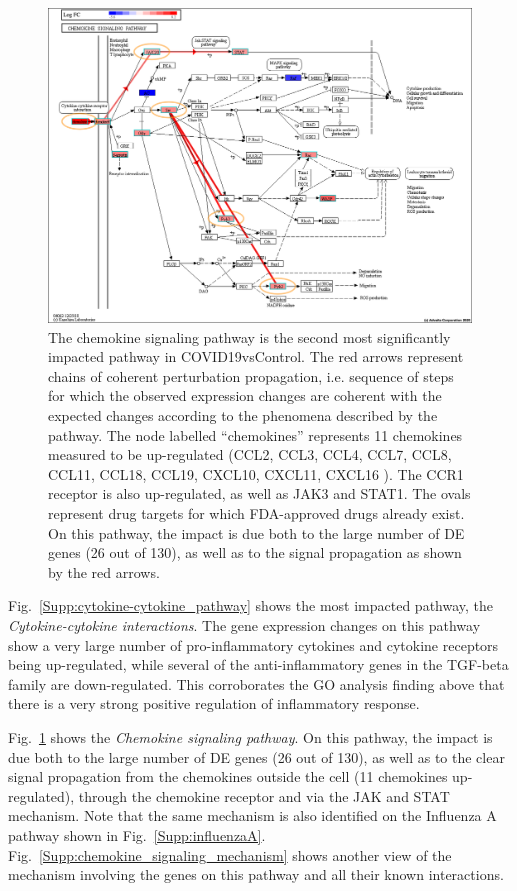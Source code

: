 \documentclass[Minh_PhD_thesis.tex]{subfiles}
\begin{document}
\begin{figure}
\centering
	\includegraphics[width=0.9\linewidth]{../Figures/Chemokine_signaling_pathway.png}
    \caption{ The chemokine signaling pathway is the second most significantly impacted pathway in COVID19vsControl. The red arrows represent chains of coherent perturbation propagation, i.e. sequence of steps for which the observed expression changes are coherent with the expected changes according to the phenomena described by the pathway. The node labelled ``chemokines'' represents 11 chemokines measured to be up-regulated (CCL2, CCL3, CCL4, CCL7, CCL8, CCL11,  CCL18, CCL19, CXCL10, CXCL11, CXCL16 ). The CCR1 receptor is also up-regulated, as well as  JAK3 and STAT1. The ovals represent drug targets for which FDA-approved drugs already exist. 
    On this pathway, the impact is due both to the large number of DE genes  (26 out of 130), as well as to the signal propagation as shown by the red arrows. }
        \label{Supp:drugs_on_chemokine_signaling}
\end{figure}

Fig.~\ref{Supp:cytokine-cytokine_pathway} shows the most impacted pathway, the \emph{Cytokine-cytokine interactions}. 
The gene expression changes on this pathway  show a very large number of pro-inflammatory cytokines and cytokine receptors being up-regulated, while several of the anti-inflammatory genes in the TGF-beta family are down-regulated. This corroborates the GO analysis finding above that there is a very strong positive regulation of inflammatory response. 
\color{black}



Fig.~\ref{Supp:drugs_on_chemokine_signaling} shows the \emph{Chemokine signaling pathway}.  
On this pathway, the impact is due both to the large number of DE genes (26 out of 130), as well as to the clear signal propagation from the chemokines outside the cell (11 chemokines up-regulated), through the chemokine receptor and via the JAK and STAT mechanism. 
Note that the same mechanism is also identified on the Influenza A pathway shown in Fig.~\ref{Supp:influenzaA}. \color{black}
Fig.~\ref{Supp:chemokine_signaling_mechanism} shows another view of the mechanism involving the genes on this pathway and all their known interactions.
\end{document}
